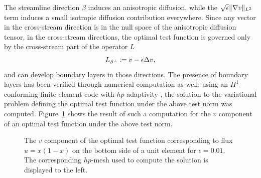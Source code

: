 The streamline direction $\beta$ induces an anisotropic diffusion, while the $\sqrt{\epsilon}\|\grad v\|_{L^2}$ term induces a small isotropic diffusion contribution everywhere. Since any vector in the cross-stream direction is in the null space of the anisotropic diffusion tensor, in the cross-stream directions, the optimal test function is governed only by the cross-stream part of the operator $L$
\[
L_{\rm \beta^\perp} \coloneqq v - \epsilon \Delta v,
\]
and can develop boundary layers in those directions. The presence of boundary layers has been verified through numerical computation as well; using an $H^1$-conforming finite element code with $hp$-adaptivity \cite{demkowicz2006computing}, the solution to the variational problem defining the optimal test function under the above test norm was computed. Figure~\ref{fig:boundaryTest} shows the result of such a computation for the $v$ component of an optimal test function under the above test norm. 
\begin{figure}[!h]
\centering
{}
\caption{The $v$ component of the optimal test function corresponding to flux $\widehat{u} = x(1-x)$ on the bottom side of a unit element for $\epsilon = 0.01$. The corresponding $hp$-mesh used to compute the solution is displayed to the left.}
\label{fig:boundaryTest}
\end{figure}

